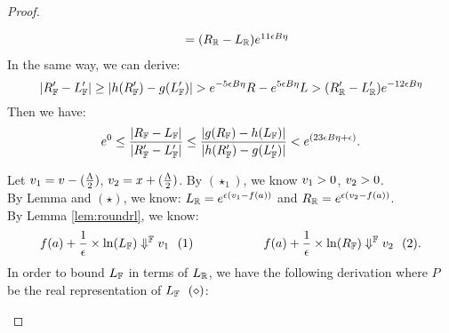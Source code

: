 \documentclass[a4paper,11pt]{article}
\begin{document}
\begin{proof}
\begin{itemize}
\[\begin{array}{ll}
		& = (R_{\mathbb{R}} - L_{\mathbb{R}})e^{11 \epsilon B \eta}
		\end{array}
		\]
		In the same way, we can derive:
		\[
		|R_{\mathbb{F}}' - L_{\mathbb{F}}'|
		\geq 
		|h(R_{\mathbb{F}}' ) - g(L_{\mathbb{F}}' )|
		 > e^{-5 \epsilon B\eta} R - e^{5 \epsilon B\eta} L
		> (R_{\mathbb{R}}' - L_{\mathbb{R}}')e^{- 12 \epsilon B \eta}
		\]
		Then we have:
		\[
		e^0 \leq 
		\frac{|R_{\mathbb{F}} - L_{\mathbb{F}} |}
		{|R_{\mathbb{F}}' - L_{\mathbb{F}}'|}
		\leq
		\frac{|g(R_{\mathbb{F}} ) - h(L_{\mathbb{F}} )|}
		{|h(R_{\mathbb{F}}' ) - g(L_{\mathbb{F}}' )|}
		< e^{(23 \epsilon B \eta + \epsilon)}.		
		\]
%

		Let $v_1 = v - (\frac{\Lambda}{2})$,
		$v_2 = x + (\frac{\Lambda}{2})$.
		By $(\star_1)$, 
		we know $v_1 > 0$, $v_2 > 0$.
		\\
		By Lemma and $(\star) $, we know: $L_{\mathbb{R}} = e^{\epsilon(v_1 - f(a))}$ and 
		$R_{\mathbb{R}} = e^{\epsilon(v_2 - f(a))}$.
		\\
		By Lemma \ref{lem:roundrl}, we know:
		$$f(a) + \frac{1}{\epsilon} \times \ln(L_{\mathbb{F}}) \Downarrow^{\mathbb{F}} v_1 ~~ (1)
		~~~~~~~~~~~~~~~~~
		f(a) + \frac{1}{\epsilon} \times \ln(R_{\mathbb{F}}) \Downarrow^{\mathbb{F}} v_2 ~~ (2).$$
	In order to bound $L_{\mathbb{F}}$ in terms of $L_{\mathbb{R}}$, we have the following derivation where $P$ be the real representation of $L_{\mathbb{F}} ~~ (\diamond)$:



\end{itemize}
\end{proof}
\end{document}

